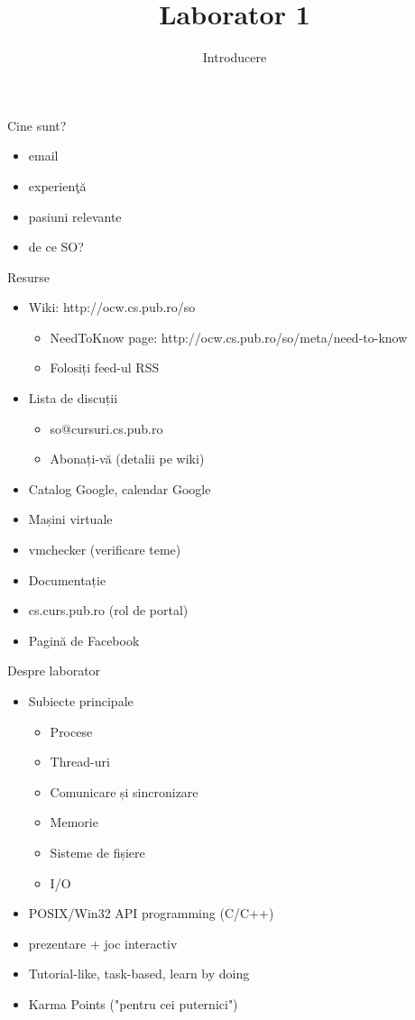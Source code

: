 \documentclass{so.cs.pub.ro}
\title[Laborator 1]{Laborator 1}
\subtitle{Introducere}
\begin{document}
\frame{\titlepage}

\begin{frame}{Cine sunt?}
  \begin{itemize}    %
    \item email
    \item experienţă
    \item pasiuni relevante
    \item de ce SO?
    \end{itemize}
\end{frame}

\begin{frame}{Resurse}
	\begin{itemize}
		\item Wiki: http://ocw.cs.pub.ro/so
		\begin{itemize}
			\item NeedToKnow page: http://ocw.cs.pub.ro/so/meta/need-to-know
			\item Folosiți feed-ul RSS 
		\end{itemize}
		\item Lista de discuții
		\begin{itemize} 
			\item so@cursuri.cs.pub.ro
			\item Abonați-vă (detalii pe wiki)
		\end{itemize}
		\item Catalog Google, calendar Google
		\item Mașini virtuale
		\item vmchecker (verificare teme)
		\item Documentație
		\item cs.curs.pub.ro (rol de portal)
		\item Pagină de Facebook
	\end{itemize}
\end{frame}

\begin{frame}{Despre laborator}
  	\begin{itemize}   
    		\item Subiecte principale
		\begin{itemize}
			\item Procese
			\item Thread-uri
			\item Comunicare și sincronizare
			\item Memorie
			\item Sisteme de fișiere
			\item I/O
		\end{itemize}
		\vspace*{0.2cm}
		\item POSIX/Win32 API programming (C/C++)
		\item prezentare + joc interactiv
		\item Tutorial-like, task-based, learn by doing
		\item Karma Points ("pentru cei puternici")
    	\end{itemize}		
\end{frame}
\end{document}
